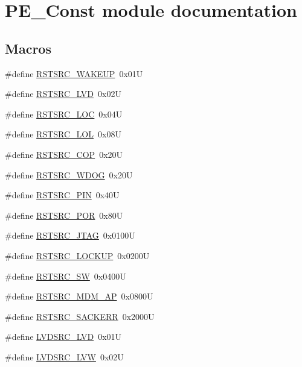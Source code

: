 \hypertarget{group___p_e___const__module}{\section{P\-E\-\_\-\-Const module documentation}
\label{group___p_e___const__module}
}
\subsection*{Macros}
\begin{DoxyCompactItemize}
\item 
\#define \hyperlink{group___p_e___const__module_gaeed5dacbb9d0e07213c8840434f6cd6a}{R\-S\-T\-S\-R\-C\-\_\-\-W\-A\-K\-E\-U\-P}~0x01\-U
\item 
\#define \hyperlink{group___p_e___const__module_gae1c2803b0eda52457ab29cb138988581}{R\-S\-T\-S\-R\-C\-\_\-\-L\-V\-D}~0x02\-U
\item 
\#define \hyperlink{group___p_e___const__module_gabb1e7755f19390476da47c14af3c0a7d}{R\-S\-T\-S\-R\-C\-\_\-\-L\-O\-C}~0x04\-U
\item 
\#define \hyperlink{group___p_e___const__module_ga653fd4a8b1b389c8ee4f906182ac1638}{R\-S\-T\-S\-R\-C\-\_\-\-L\-O\-L}~0x08\-U
\item 
\#define \hyperlink{group___p_e___const__module_ga140be6eb76fc072ee4176e965b87b244}{R\-S\-T\-S\-R\-C\-\_\-\-C\-O\-P}~0x20\-U
\item 
\#define \hyperlink{group___p_e___const__module_ga789b8aee910293e98e3d259ced79864c}{R\-S\-T\-S\-R\-C\-\_\-\-W\-D\-O\-G}~0x20\-U
\item 
\#define \hyperlink{group___p_e___const__module_gabdcb9366c44b44d35909bdbf2fcf3d9d}{R\-S\-T\-S\-R\-C\-\_\-\-P\-I\-N}~0x40\-U
\item 
\#define \hyperlink{group___p_e___const__module_ga3511c871d0a516c574a91e1bac210238}{R\-S\-T\-S\-R\-C\-\_\-\-P\-O\-R}~0x80\-U
\item 
\#define \hyperlink{group___p_e___const__module_ga00a839ede0e69be1bc641f907de8b5f8}{R\-S\-T\-S\-R\-C\-\_\-\-J\-T\-A\-G}~0x0100\-U
\item 
\#define \hyperlink{group___p_e___const__module_ga46168abf3bfc8b58479ecace7641559b}{R\-S\-T\-S\-R\-C\-\_\-\-L\-O\-C\-K\-U\-P}~0x0200\-U
\item 
\#define \hyperlink{group___p_e___const__module_ga3c4274430f181cdab8c0c705df651784}{R\-S\-T\-S\-R\-C\-\_\-\-S\-W}~0x0400\-U
\item 
\#define \hyperlink{group___p_e___const__module_ga18886b7d76fe2b7babb3c16428f6af06}{R\-S\-T\-S\-R\-C\-\_\-\-M\-D\-M\-\_\-\-A\-P}~0x0800\-U
\item 
\#define \hyperlink{group___p_e___const__module_ga2bdec236f4f5002701b3672613078d95}{R\-S\-T\-S\-R\-C\-\_\-\-S\-A\-C\-K\-E\-R\-R}~0x2000\-U
\item 
\#define \hyperlink{group___p_e___const__module_gac31efdf3ba841e59289e3c11b5bf407c}{L\-V\-D\-S\-R\-C\-\_\-\-L\-V\-D}~0x01\-U
\item 
\#define \hyperlink{group___p_e___const__module_gafe8ffb97db9ede1045779df7d0eac3e4}{L\-V\-D\-S\-R\-C\-\_\-\-L\-V\-W}~0x02\-U
\end{DoxyCompactItemize}


